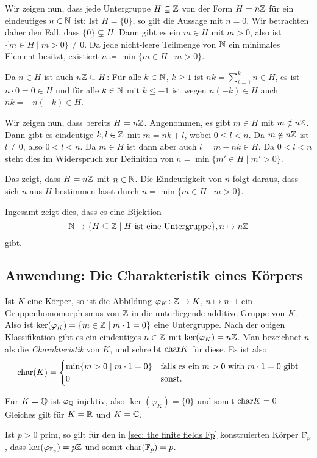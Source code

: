 Wir zeigen nun, dass jede Untergruppe $H \subseteq \mathbb{Z}$ von der Form $H = n\mathbb{Z}$ für ein eindeutiges $n \in \mathbb{N}$ ist: Ist $H = \{0\}$, so gilt die Aussage mit $n = 0$. Wir betrachten daher den Fall, dass $\{0\} \subsetneq H$. Dann gibt es ein $m \in H$ mit $m > 0$, also ist $\{m \in H \mid m > 0\} \neq 0$. Da jede nicht-leere Teilmenge von $\mathbb{N}$ ein minimales Element besitzt, existiert $n \coloneqq \min \{m \in H \mid m > 0\}$.

Da $n \in H$ ist auch $n\mathbb{Z} \subseteq H$: Für alle $k \in \mathbb{N}$, $k \geq 1$ ist $n k = \sum_{i=1}^k n \in H$, es ist $n \cdot 0 = 0 \in H$ und für alle $k \in \mathbb{N}$ mit $k \leq -1$ ist wegen $n(-k) \in H$ auch $nk = -n(-k) \in H$.

Wir zeigen nun, dass bereits $H = n\mathbb{Z}$. Angenommen, es gibt $m \in H$ mit $m \notin n\mathbb{Z}$. Dann gibt es eindeutige $k,l \in \mathbb{Z}$ mit $m = nk + l$, wobei $0 \leq l < n$. Da $m \notin n\mathbb{Z}$ ist $l \neq 0$, also $0 < l < n$. Da $m \in H$ ist dann aber auch $l = m - nk \in H$. Da $0 < l < n$ steht dies im Widerspruch zur Definition von $n = \min \{m' \in H \mid m' > 0\}$.

Das zeigt, dass $H = n\mathbb{Z}$ mit $n \in \mathbb{N}$. Die Eindeutigkeit von $n$ folgt daraus, dass sich $n$ aus $H$ bestimmen lässt durch $n = \min \{m \in H \mid m > 0\}$.

Ingesamt zeigt dies, dass es eine Bijektion
\[
 \mathbb{N} \rightarrow \{H \subseteq \mathbb{Z} \mid \text{$H$ ist eine Untergruppe}\}, n \mapsto n\mathbb{Z}
\]
gibt.


\subsection{Anwendung: Die Charakteristik eines Körpers}
Ist $K$ eine Körper, so ist die Abbildung $\varphi_K \colon \mathbb{Z} \to K$, $n \mapsto n \cdot 1$ ein Gruppenhomomorphismus von $\mathbb{Z}$ in die unterliegende additive Gruppe von $K$. Also ist $\ker(\varphi_K) = \{m \in \mathbb{Z} \mid m \cdot 1 = 0\}$ eine Untergruppe. Nach der obigen Klassifikation gibt es ein eindeutiges $n \in \mathbb{Z}$ mit $\ker(\varphi_K) = n \mathbb{Z}$. Man bezeichnet $n$ als die \emph{Charakteristik} von $K$, und schreibt $\mathrm{char} K$ für diese. Es ist also
\[
 \mathrm{char}(K) =
 \begin{cases}
  \min\{m > 0 \mid m \cdot 1 = 0\} & \text{falls es ein $m > 0$ with $m \cdot 1 = 0$ gibt} \\
  0                                & \text{sonst}.
 \end{cases}
\]


\begin{bsp}
 Für $K = \mathbb{Q}$ ist $\varphi_{\mathbb{Q}}$ injektiv, also $\ker(\varphi_K) = \{0\}$ und somit $\mathrm{char} K = 0$. Gleiches gilt für $K = \mathbb{R}$ und $K = \mathbb{C}$.
 
 Ist $p > 0$ prim, so gilt für den in \ref{sec: the finite fields Fp} konstruierten Körper $\mathbb{F}_p$, dass $\ker(\varphi_{\mathbb{F}_p}) = p\mathbb{Z}$ und somit $\mathrm{char}(\mathbb{F}_p) = p$.
\end{bsp}

